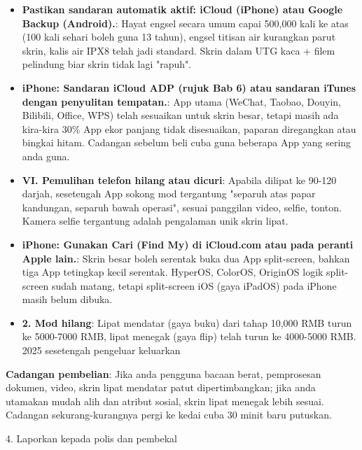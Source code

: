 \begin{itemize}
  \item \textbf{Pastikan sandaran automatik aktif: iCloud (iPhone) atau Google Backup (Android).}: Hayat engsel secara umum capai 500,000 kali ke atas (100 kali sehari boleh guna 13 tahun), engsel titisan air kurangkan parut skrin, kalis air IPX8 telah jadi standard. Skrin dalam UTG kaca + filem pelindung biar skrin tidak lagi "rapuh".
  \item \textbf{iPhone: Sandaran iCloud ADP (rujuk Bab 6) atau sandaran iTunes dengan penyulitan tempatan.}: App utama (WeChat, Taobao, Douyin, Bilibili, Office, WPS) telah sesuaikan untuk skrin besar, tetapi masih ada kira-kira 30\% App ekor panjang tidak disesuaikan, paparan diregangkan atau bingkai hitam. Cadangan sebelum beli cuba guna beberapa App yang sering anda guna.
  \item \textbf{VI. Pemulihan telefon hilang atau dicuri}: Apabila dilipat ke 90-120 darjah, sesetengah App sokong mod tergantung "separuh atas papar kandungan, separuh bawah operasi", sesuai panggilan video, selfie, tonton. Kamera selfie tergantung adalah pengalaman unik skrin lipat.
  \item \textbf{iPhone: Gunakan Cari (Find My) di iCloud.com atau pada peranti Apple lain.}: Skrin besar boleh serentak buka dua App split-screen, bahkan tiga App tetingkap kecil serentak. HyperOS, ColorOS, OriginOS logik split-screen sudah matang, tetapi split-screen iOS (gaya iPadOS) pada iPhone masih belum dibuka.
  \item \textbf{2. Mod hilang}: Lipat mendatar (gaya buku) dari tahap 10,000 RMB turun ke 5000-7000 RMB, lipat menegak (gaya flip) telah turun ke 4000-5000 RMB. 2025 sesetengah pengeluar keluarkan
\end{itemize}

\textbf{Cadangan pembelian}: Jika anda pengguna bacaan berat, pemprosesan dokumen, video, skrin lipat mendatar patut dipertimbangkan; jika anda utamakan mudah alih dan atribut sosial, skrin lipat menegak lebih sesuai. Cadangan sekurang-kurangnya pergi ke kedai cuba 30 minit baru putuskan.


4. Laporkan kepada polis dan pembekal

